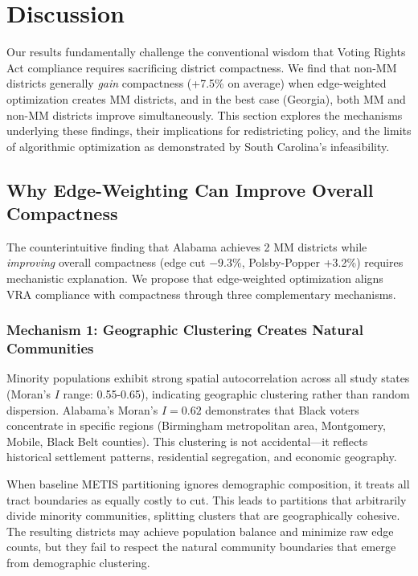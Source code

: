 
\section{Discussion}

Our results fundamentally challenge the conventional wisdom that Voting Rights Act compliance requires sacrificing district compactness. We find that non-MM districts generally \emph{gain} compactness (+7.5\% on average) when edge-weighted optimization creates MM districts, and in the best case (Georgia), both MM and non-MM districts improve simultaneously. This section explores the mechanisms underlying these findings, their implications for redistricting policy, and the limits of algorithmic optimization as demonstrated by South Carolina's infeasibility.

\subsection{Why Edge-Weighting Can Improve Overall Compactness}

The counterintuitive finding that Alabama achieves 2 MM districts while \emph{improving} overall compactness (edge cut $-9.3$\%, Polsby-Popper +3.2\%) requires mechanistic explanation. We propose that edge-weighted optimization aligns VRA compliance with compactness through three complementary mechanisms.

\subsubsection{Mechanism 1: Geographic Clustering Creates Natural Communities}

Minority populations exhibit strong spatial autocorrelation across all study states (Moran's $I$ range: 0.55-0.65), indicating geographic clustering rather than random dispersion. Alabama's Moran's $I = 0.62$ demonstrates that Black voters concentrate in specific regions (Birmingham metropolitan area, Montgomery, Mobile, Black Belt counties). This clustering is not accidental---it reflects historical settlement patterns, residential segregation, and economic geography.

When baseline METIS partitioning ignores demographic composition, it treats all tract boundaries as equally costly to cut. This leads to partitions that arbitrarily divide minority communities, splitting clusters that are geographically cohesive. The resulting districts may achieve population balance and minimize raw edge counts, but they fail to respect the natural community boundaries that emerge from demographic clustering.

